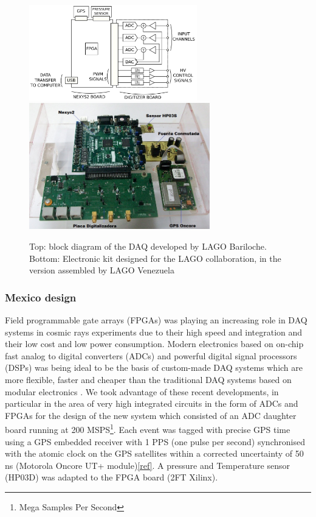 \begin{figure}[htp!]
 \centering
 \includegraphics[width=0.65\textwidth,height=0.25\textheight]{images/bloques_electronica.png}
 \includegraphics[width=0.70\textwidth,height=0.30\textheight]{images/venezuela/nuevaLS.jpg}
 \caption{Top: block diagram of the DAQ developed by LAGO Bariloche. Bottom:
Electronic kit designed for the LAGO collaboration, in the version assembled by
LAGO Venezuela} \label{fig:electronic-b}
\end{figure}  

\subsubsection*{Mexico design}

Field programmable gate arrays (FPGAs) was playing an increasing role in DAQ
systems in cosmic rays experiments due to their high speed and integration and
their low cost and low power consumption. Modern electronics based on on-chip
fast analog to digital converters (ADCs) and powerful digital signal processors
(DSPs) was being  ideal to be the basis of custom-made DAQ systems which are
more flexible, faster and cheaper than the traditional DAQ systems based on
modular electronics \cite{all:09}. We took advantage of these recent
developments, in particular in the area of very high integrated circuits in the
form of ADCs and FPGAs for the design of the new system which consisted of an
ADC daughter board running at 200 MSPS\footnote{Mega Samples Per Second}. Each
event was tagged with precise GPS time using a GPS embedded receiver with 1 PPS
(one pulse per second) synchronised with the atomic clock on the GPS satellites
within a corrected uncertainty of 50\,ns (Motorola Oncore UT+ module)\ref{ref}.
A pressure and Temperature sensor (HP03D) was adapted to the FPGA board (2FT
Xilinx).

